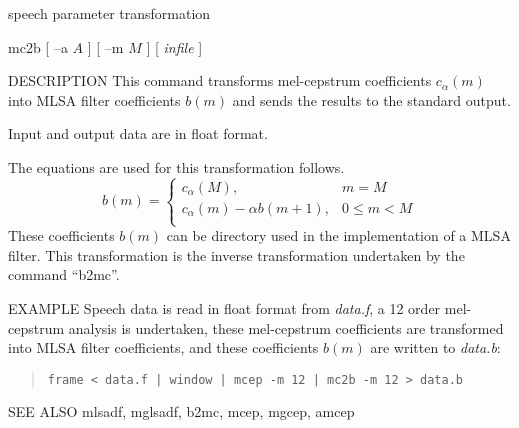 %
{speech parameter transformation}

\begin{synopsis}
 \item [mc2b] [ --a $A$ ] [ --m $M$ ] [ {\em infile} ]
\end{synopsis}

\begin{qsection}{DESCRIPTION}
This command transforms mel-cepstrum coefficients $c_\alpha(m)$ 
into MLSA filter coefficients $b(m)$ and sends the results
to the standard output.
\par
Input and output data are in float format.
\par
The equations are used for this transformation follows.
\begin{displaymath}
b(m) = \left\{
	\begin{array}{ll}
	  c_\alpha(M), & m=M \\
	  c_\alpha(m) - \alpha b(m+1), & 0 \leq m < M \\
	\end{array} \right.
\end{displaymath}
These coefficients $b(m)$ can be directory used in the
implementation of a MLSA filter.
This transformation is the inverse transformation undertaken
by the command ``b2mc''.
\end{qsection}

\begin{options}
\end{options}

\begin{qsection}{EXAMPLE}
Speech data is read in float format from {\em data.f},
a 12 order mel-cepstrum analysis is undertaken,
these mel-cepstrum coefficients are transformed into
MLSA filter coefficients, and these coefficients $b(m)$
are written to {\em data.b}:
\begin{quote}
 \verb!frame < data.f | window | mcep -m 12 | mc2b -m 12 > data.b!
\end{quote} 
\end{qsection}

\begin{qsection}{SEE ALSO}
 mlsadf, mglsadf, b2mc, mcep, mgcep, amcep
\end{qsection}
